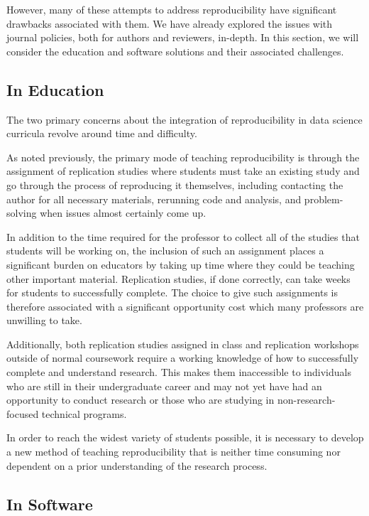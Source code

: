 \documentclass[12pt,twoside]{reedthesis}
\begin{document}
However, many of these attempts to address reproducibility have
significant drawbacks associated with them. We have already explored the
issues with journal policies, both for authors and reviewers, in-depth.
In this section, we will consider the education and software solutions
and their associated challenges.

\subsection{In Education}\label{in-education}

The two primary concerns about the integration of reproducibility in
data science curricula revolve around time and difficulty.

As noted previously, the primary mode of teaching reproducibility is
through the assignment of replication studies where students must take
an existing study and go through the process of reproducing it
themselves, including contacting the author for all necessary materials,
rerunning code and analysis, and problem-solving when issues almost
certainly come up.

In addition to the time required for the professor to collect all of the
studies that students will be working on, the inclusion of such an
assignment places a significant burden on educators by taking up time
where they could be teaching other important material. Replication
studies, if done correctly, can take weeks for students to successfully
complete. The choice to give such assignments is therefore associated
with a significant opportunity cost which many professors are unwilling
to take.

Additionally, both replication studies assigned in class and replication
workshops outside of normal coursework require a working knowledge of
how to successfully complete and understand research. This makes them
inaccessible to individuals who are still in their undergraduate career
and may not yet have had an opportunity to conduct research or those who
are studying in non-research-focused technical programs.

In order to reach the widest variety of students possible, it is
necessary to develop a new method of teaching reproducibility that is
neither time consuming nor dependent on a prior understanding of the
research process.

\subsection{In Software}\label{in-software}
\end{document}
